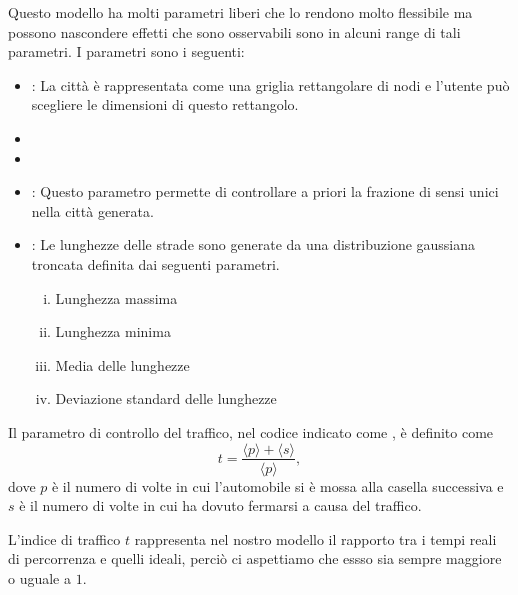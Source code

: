\documentclass[main.tex]{subfiles}
\begin{document}
Questo modello ha molti parametri liberi che lo rendono molto flessibile ma possono nascondere effetti che sono osservabili sono in alcuni range di 
tali parametri. 
I parametri sono i seguenti:
\begin{itemize}
    \item {}:
        La città è rappresentata come una griglia rettangolare di nodi e l'utente
        può scegliere le dimensioni di questo rettangolo.
    \item {}
    \item {}
    \item {}:
        Questo parametro permette di controllare a priori la frazione di sensi unici nella città generata.
    \item {}:
        Le lunghezze delle strade sono generate da una distribuzione gaussiana troncata definita dai seguenti parametri.
        \begin{enumerate}[(i)]
            \item Lunghezza massima
            \item Lunghezza minima
            \item Media delle lunghezze
            \item Deviazione standard delle lunghezze
        \end{enumerate}
\end{itemize}

Il parametro di controllo del traffico, nel codice indicato come , è definito come
\[ t =  \frac{\langle p \rangle + \langle s \rangle}{\langle p \rangle}, \]
dove $p$ è il numero di volte in cui l'automobile si è mossa alla casella successiva e $s$ è il numero di volte in cui ha dovuto
fermarsi a causa del traffico.

L'indice di traffico $t$ rappresenta nel nostro modello il rapporto tra i tempi reali di percorrenza e quelli ideali, perciò ci aspettiamo che 
essso sia sempre maggiore o uguale a $1$.
\end{document}
